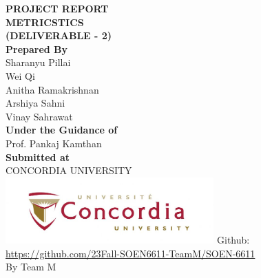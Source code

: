 \documentclass[english,12pt,a4paper]{report}
\begin{document}
	\begin{titlepage}
		\centering
		\Huge
		\textbf{PROJECT REPORT}\\
		\vspace{1cm}
		\textbf{METRICSTICS}\\
		\textbf{(DELIVERABLE - 2)}\\
		\vspace{1.5cm}
		\Large
		\textbf{Prepared By}\\
		\vspace{0.5cm}
		Sharanyu Pillai\\
		Wei Qi\\
		Anitha Ramakrishnan\\
		Arshiya Sahni\\
		Vinay Sahrawat\\
		\vspace{1.5cm}
		\large
		\textbf{Under the Guidance of}\\
		Prof. Pankaj Kamthan \\
		\textbf{Submitted at}\\
		CONCORDIA UNIVERSITY\\
		\centering
		\includegraphics[width=8cm]{concordia.jpg}
		\vfill
		Github:\\
		\url{https://github.com/23Fall-SOEN6611-TeamM/SOEN-6611} \\
		By Team M
		\thispagestyle{empty} 
	\end{titlepage}
	
	\newpage 
	\setcounter{page}{0}
	\tableofcontents
	\clearpage
	
	
	
\end{document}
